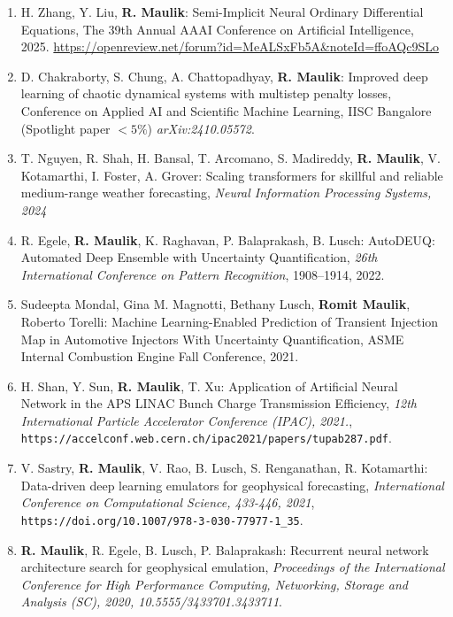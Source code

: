 \documentclass[letterpaper]{article}
\begin{document}
\begin{enumerate}

\item H. Zhang, Y. Liu, \textbf{R. Maulik}: Semi-Implicit Neural Ordinary Differential Equations, The 39th Annual AAAI Conference on Artificial Intelligence, 2025. \url{https://openreview.net/forum?id=MeALSxFb5A&noteId=ffoAQc9SLo}

\item D. Chakraborty, S. Chung, A. Chattopadhyay, \textbf{R. Maulik}: Improved deep learning of chaotic dynamical systems with multistep penalty losses, Conference on Applied AI and Scientific Machine Learning, IISC Bangalore (Spotlight paper $<5\%$) {\it arXiv:2410.05572}.

\item T. Nguyen, R. Shah, H. Bansal, T. Arcomano, S. Madireddy, \textbf{R. Maulik}, V. Kotamarthi, I. Foster, A. Grover: Scaling transformers for skillful and reliable medium-range weather forecasting, {\it Neural Information Processing Systems, 2024}

\item R. Egele, \textbf{R. Maulik}, K. Raghavan, P. Balaprakash, B. Lusch: AutoDEUQ: Automated Deep Ensemble with Uncertainty Quantification, {\it 26th International Conference on Pattern Recognition}, 1908--1914, 2022.

\item Sudeepta Mondal, Gina M. Magnotti, Bethany Lusch, \textbf{Romit Maulik}, Roberto Torelli: Machine Learning-Enabled Prediction of Transient Injection Map in Automotive Injectors With Uncertainty Quantification, ASME Internal Combustion Engine Fall Conference, 2021. 

\item H. Shan, Y. Sun, \textbf{R. Maulik}, T. Xu: Application of Artificial Neural Network in the APS LINAC Bunch Charge Transmission Efficiency, {\it 12th International Particle Accelerator Conference (IPAC), 2021.}, \\ \texttt{https://accelconf.web.cern.ch/ipac2021/papers/tupab287.pdf}.

\item V. Sastry, \textbf{R. Maulik}, V. Rao, B. Lusch, S. Renganathan, R. Kotamarthi: Data-driven deep learning emulators for geophysical forecasting, {\it International Conference on Computational Science, 433-446, 2021}, \\ \texttt{https://doi.org/10.1007/978-3-030-77977-1\_35}. 

\item \textbf{R. Maulik}, R. Egele, B. Lusch,  P. Balaprakash: Recurrent neural network architecture search for geophysical emulation, {\it Proceedings of the International Conference for High Performance Computing, Networking, Storage and Analysis (SC), 2020, 10.5555/3433701.3433711}. 


\end{enumerate}
\end{document}
